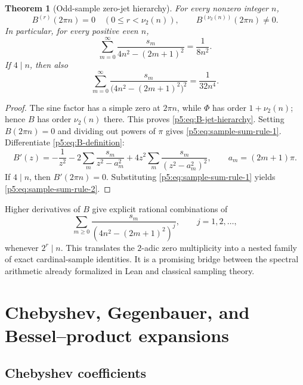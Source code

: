 \documentclass[11pt,oneside]{article}
\newtheorem{theorem}{Theorem}[section]
\theoremstyle{definition}
\newcommand{\vtwo}{\nu_2}
\begin{document}
\begin{theorem}[Odd-sample zero-jet hierarchy]
\label{p5:thm:sample-jet-hierarchy}
For every nonzero integer $n$,
\begin{equation}
 B^{(r)}(2\pi n)=0
 \quad(0\le r<\vtwo(n)),
 \qquad
 B^{(\vtwo(n))}(2\pi n)\ne0.                             \label{p5:eq:B-jet-hierarchy}
\end{equation}
In particular, for every positive even $n$,
\begin{equation}
 \boxed{\displaystyle
 \sum_{m=0}^\infty
 \frac{s_m}{4n^2-(2m+1)^2}=\frac1{8n^2}.}               \label{p5:eq:sample-sum-rule-1}
\end{equation}
If $4\mid n$, then also
\begin{equation}
 \boxed{\displaystyle
 \sum_{m=0}^\infty
 \frac{s_m}{\bigl(4n^2-(2m+1)^2\bigr)^2}
 =\frac1{32n^4}.}                                       \label{p5:eq:sample-sum-rule-2}
\end{equation}
\end{theorem}

\begin{proof}
The sine factor has a simple zero at $2\pi n$, while $\Phi$ has order
$1+\vtwo(n)$; hence $B$ has order $\vtwo(n)$ there.  This proves
\eqref{p5:eq:B-jet-hierarchy}.  Setting $B(2\pi n)=0$ and dividing out powers of
$\pi$ gives \eqref{p5:eq:sample-sum-rule-1}.  Differentiate
\eqref{p5:eq:B-definition}:
\[
 B'(z)=-\frac1{z^2}
 -2\sum_m\frac{s_m}{z^2-a_m^2}
 +4z^2\sum_m\frac{s_m}{(z^2-a_m^2)^2},
 \qquad a_m=(2m+1)\pi.
\]
If $4\mid n$, then $B'(2\pi n)=0$.  Substituting
\eqref{p5:eq:sample-sum-rule-1} yields \eqref{p5:eq:sample-sum-rule-2}.
\end{proof}

Higher derivatives of $B$ give explicit rational combinations of
\[
 \sum_{m\ge0}\frac{s_m}
 {(4n^2-(2m+1)^2)^j},\qquad j=1,2,\ldots,                \label{p5:eq:sample-hierarchy-sums}
\]
whenever $2^r\mid n$.  This translates the $2$-adic zero multiplicity into a
nested family of exact cardinal-sample identities.  It is a promising bridge
between the spectral arithmetic already formalized in Lean and classical
sampling theory.

\section{Chebyshev, Gegenbauer, and Bessel--product expansions}
\label{p5:sec:bessel}

\subsection{Chebyshev coefficients}
\end{document}
